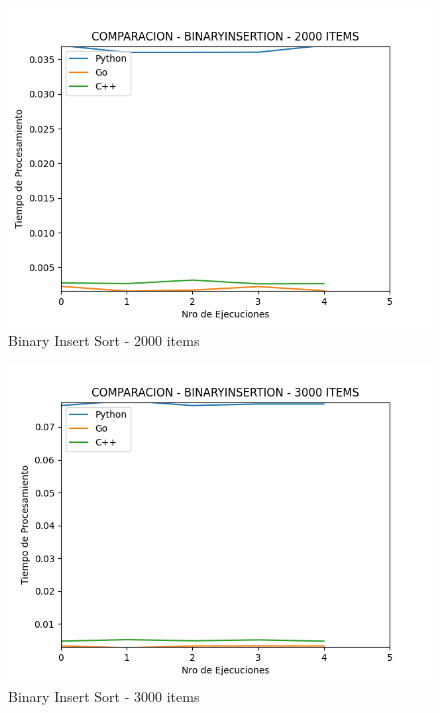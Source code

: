 \documentclass[12pt]{article} %
\begin{document}
    \vspace{5mm}
    
    \begin{figure}[H]
    \centering
    \includegraphics[width=\textwidth]{binaryInsertion_2000}
    \caption{Binary Insert Sort - 2000 items}
    \end{figure}
    
    \vspace{5mm}
    
    \begin{figure}[H]
    \centering
    \includegraphics[width=\textwidth]{binaryInsertion_3000}
    \caption{Binary Insert Sort - 3000 items}
    \end{figure}
    
\end{document}
